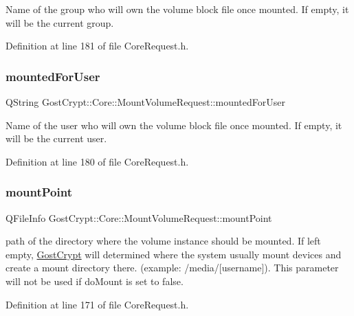 Name of the group who will own the volume block file once mounted. If empty, it will be the current group. 

Definition at line 181 of file Core\+Request.\+h.

\mbox{\label{struct_gost_crypt_1_1_core_1_1_mount_volume_request_a01b3f0045317668cd4cf66fca458603c}} 
\subsubsection{\texorpdfstring{mounted\+For\+User}{mountedForUser}}
{\footnotesize\ttfamily Q\+String Gost\+Crypt\+::\+Core\+::\+Mount\+Volume\+Request\+::mounted\+For\+User}

Name of the user who will own the volume block file once mounted. If empty, it will be the current user. 

Definition at line 180 of file Core\+Request.\+h.

\mbox{\label{struct_gost_crypt_1_1_core_1_1_mount_volume_request_a4ed6d34a588a845b15f11074c5302a76}} 
\subsubsection{\texorpdfstring{mount\+Point}{mountPoint}}
{\footnotesize\ttfamily Q\+File\+Info Gost\+Crypt\+::\+Core\+::\+Mount\+Volume\+Request\+::mount\+Point}

path of the directory where the volume instance should be mounted. If left empty, \hyperlink{namespace_gost_crypt}{Gost\+Crypt} will determined where the system usually mount devices and create a mount directory there. (example\+: /media/\mbox{[}username\mbox{]}). This parameter will not be used if do\+Mount is set to false. 

Definition at line 171 of file Core\+Request.\+h.

